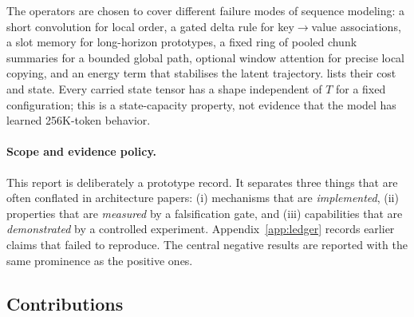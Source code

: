 The operators are chosen to cover different failure modes of sequence modeling:
a short convolution for local order, a gated delta rule for key$\to$value associations, a
slot memory for long-horizon prototypes, a fixed ring of pooled chunk summaries for a bounded
global path, optional window attention for precise local copying, and an energy term that
stabilises the latent trajectory.  lists their cost and state. Every carried
state tensor has a shape independent of $T$ for a fixed configuration; this is a state-capacity
property, not evidence that the model has learned 256K-token behavior.

\paragraph{Scope and evidence policy.}
This report is deliberately a prototype record. It separates three things that are often
conflated in architecture papers: (i) mechanisms that are \emph{implemented}, (ii) properties
that are \emph{measured} by a falsification gate, and (iii) capabilities that are
\emph{demonstrated} by a controlled experiment. Appendix~\ref{app:ledger} records earlier
claims that failed to reproduce. The central negative results are reported with the same
prominence as the positive ones.

\subsection{Contributions}

